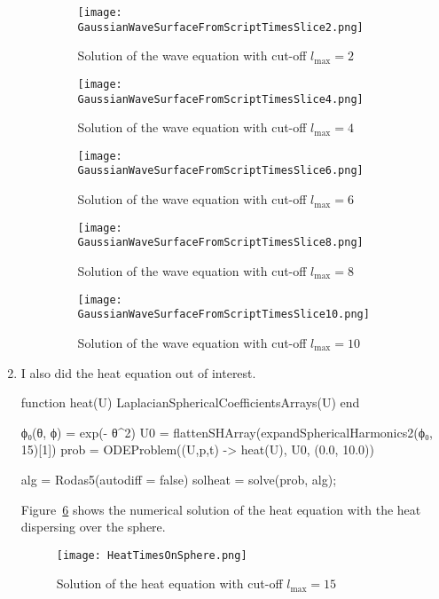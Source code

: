 \documentclass[12pt,a4]{article}
\begin{document}
\begin{enumerate}
\begin{enumerate}
        \begin{figure}[H]
          \centering
          \texttt{[image: GaussianWaveSurfaceFromScriptTimesSlice2.png]}
          \caption{Solution of the wave equation with cut-off $l_\text{max} = 2$}
          \label{fig:lmax2}
        \end{figure}
        \newpage
        \begin{figure}[H]
          \centering
          \texttt{[image: GaussianWaveSurfaceFromScriptTimesSlice4.png]}
          \caption{Solution of the wave equation with cut-off $l_\text{max} = 4$}
          \label{fig:lmax4}
        \end{figure}
        \newpage
        \begin{figure}[H]
          \centering
          \texttt{[image: GaussianWaveSurfaceFromScriptTimesSlice6.png]}
          \caption{Solution of the wave equation with cut-off $l_\text{max} = 6$}
          \label{fig:lmax6}
        \end{figure}
        \newpage
        \begin{figure}[H]
          \centering
          \texttt{[image: GaussianWaveSurfaceFromScriptTimesSlice8.png]}
          \caption{Solution of the wave equation with cut-off $l_\text{max} = 8$}
          \label{fig:lmax8}
        \end{figure}
        \newpage
        \begin{figure}[H]
          \centering
          \texttt{[image: GaussianWaveSurfaceFromScriptTimesSlice10.png]}
          \caption{Solution of the wave equation with cut-off $l_\text{max} = 10$}
          \label{fig:lmax10}
        \end{figure}
        \newpage
    \end{enumerate}
    \newpage
  \item
    I also did the heat equation out of interest.
\begin{jllisting}
function heat(U)
  LaplacianSphericalCoefficientsArrays(U)
end

ϕ₀(θ, ϕ) = exp(- θ^2)
U0 = flattenSHArray(expandSphericalHarmonics2(ϕ₀, 15)[1])
prob = ODEProblem((U,p,t) -> heat(U), U0, (0.0, 10.0))

alg = Rodas5(autodiff = false)
solheat = solve(prob, alg);
\end{jllisting}
  
  Figure~\ref{fig:heat} shows the numerical solution of the heat equation with the heat dispersing over the sphere.
  \begin{figure}[H]
    \centering
    \texttt{[image: HeatTimesOnSphere.png]}
    \caption{Solution of the heat equation with cut-off $l_\text{max} = 15$}
    \label{fig:heat}
  \end{figure}
\end{enumerate}
\end{document}
